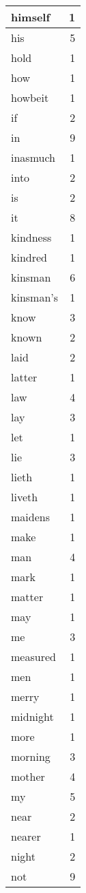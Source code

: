 \begin{center}
\begin{longtable}{l|r}
himself & 1 \\ \hline
his & 5 \\ \hline
hold & 1 \\ \hline
how & 1 \\ \hline
howbeit & 1 \\ \hline
if & 2 \\ \hline
in & 9 \\ \hline
inasmuch & 1 \\ \hline
into & 2 \\ \hline
is & 2 \\ \hline
it & 8 \\ \hline
kindness & 1 \\ \hline
kindred & 1 \\ \hline
kinsman & 6 \\ \hline
kinsman's & 1 \\ \hline
know & 3 \\ \hline
known & 2 \\ \hline
laid & 2 \\ \hline
latter & 1 \\ \hline
law & 4 \\ \hline
lay & 3 \\ \hline
let & 1 \\ \hline
lie & 3 \\ \hline
lieth & 1 \\ \hline
liveth & 1 \\ \hline
maidens & 1 \\ \hline
make & 1 \\ \hline
man & 4 \\ \hline
mark & 1 \\ \hline
matter & 1 \\ \hline
may & 1 \\ \hline
me & 3 \\ \hline
measured & 1 \\ \hline
men & 1 \\ \hline
merry & 1 \\ \hline
midnight & 1 \\ \hline
more & 1 \\ \hline
morning & 3 \\ \hline
mother & 4 \\ \hline
my & 5 \\ \hline
near & 2 \\ \hline
nearer & 1 \\ \hline
night & 2 \\ \hline
not & 9 \\ \hline

\end{longtable}
\end{center}
